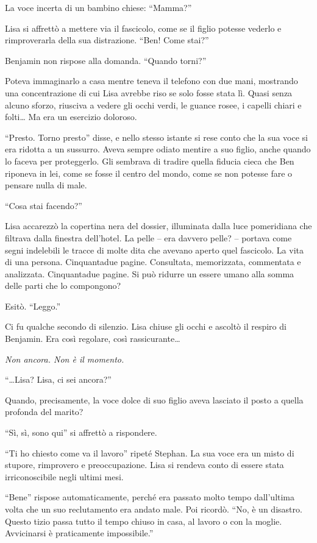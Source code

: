 \documentclass[a4paper,oneside,11pt]{memoir}
\begin{document}
La voce incerta di un bambino chiese: ``Mamma?''

Lisa si affrettò a mettere via il fascicolo, come se il figlio potesse vederlo e
rimproverarla della sua distrazione. ``Ben! Come stai?''

Benjamin non rispose alla domanda. ``Quando torni?''

Poteva immaginarlo a casa mentre teneva il telefono con due mani, mostrando una
concentrazione di cui Lisa avrebbe riso se solo fosse stata lì. Quasi senza
alcuno sforzo, riusciva a vedere gli occhi verdi, le guance rosee, i capelli
chiari e folti\dots{} Ma era un esercizio doloroso.

``Presto. Torno presto'' disse, e nello stesso istante si rese conto che la sua
voce si era ridotta a un sussurro. Aveva sempre odiato mentire a suo figlio,
anche quando lo faceva per proteggerlo. Gli sembrava di tradire quella fiducia
cieca che Ben riponeva in lei, come se fosse il centro del mondo, come se non
potesse fare o pensare nulla di male.

``Cosa stai facendo?''

Lisa accarezzò la copertina nera del dossier, illuminata dalla luce pomeridiana
che filtrava dalla finestra dell'hotel. La pelle -- era davvero pelle? --
portava come segni indelebili le tracce di molte dita che avevano aperto quel
fascicolo. La vita di una persona. Cinquantadue pagine. Consultata, memorizzata,
commentata e analizzata. Cinquantadue pagine. Si può ridurre un essere umano
alla somma delle parti che lo compongono?

Esitò. ``Leggo.''

Ci fu qualche secondo di silenzio. Lisa chiuse gli occhi e ascoltò il respiro di
Benjamin. Era così regolare, così rassicurante\dots{}

\emph{Non ancora. Non è il momento.}

``\dots{}Lisa? Lisa, ci sei ancora?''

Quando, precisamente, la voce dolce di suo figlio aveva lasciato il posto a
quella profonda del marito?

``Sì, sì, sono qui'' si affrettò a rispondere.

``Ti ho chiesto come va il lavoro'' ripeté Stephan. La sua voce era un misto di
stupore, rimprovero e preoccupazione. Lisa si rendeva conto di essere stata
irriconoscibile negli ultimi mesi.

``Bene'' rispose automaticamente, perché era passato molto tempo dall'ultima
volta che un suo reclutamento era andato male. Poi ricordò. ``No, è un disastro.
Questo tizio passa tutto il tempo chiuso in casa, al lavoro o con la moglie.
Avvicinarsi è praticamente impossibile.''
\end{document}
